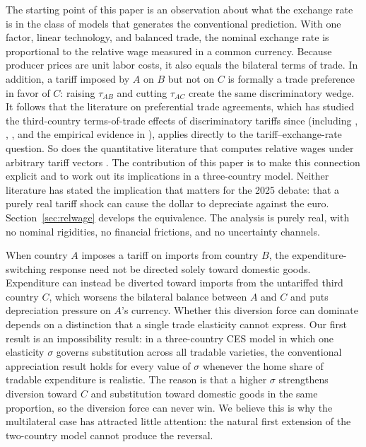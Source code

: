 \documentclass[11pt]{article}
\theoremstyle{plain}
\theoremstyle{remark}
\numberwithin{lemma}{section}
\numberwithin{proposition}{section}
\numberwithin{corollary}{section}
\newenvironment{revblock}{\par\begingroup\color{RevBlue}}{\endgroup\par}
\begin{document}
\begin{revblock}
The starting point of this paper is an observation about what the exchange rate is in the class of models that generates the conventional prediction. With one factor, linear technology, and balanced trade, the nominal exchange rate is proportional to the relative wage measured in a common currency. Because producer prices are unit labor costs, it also equals the bilateral terms of trade. In addition, a tariff imposed by $A$ on $B$ but not on $C$ is formally a trade preference in favor of $C$: raising $\tau_{AB}$ and cutting $\tau_{AC}$ create the same discriminatory wedge. It follows that the literature on preferential trade agreements, which has studied the third-country terms-of-trade effects of discriminatory tariffs since \cite{viner1950} (including \cite{mundell1964}, \cite{kempwan1976}, \cite{bagwell1999, bagwell2002}, and the empirical evidence in \cite{changwinters2002}), applies directly to the tariff--exchange-rate question. So does the quantitative literature that computes relative wages under arbitrary tariff vectors \citep{caliendo2015, ossa2014, costinot2014}. The contribution of this paper is to make this connection explicit and to work out its implications in a three-country model. Neither literature has stated the implication that matters for the 2025 debate: that a purely real tariff shock can cause the dollar to depreciate against the euro. Section~\ref{sec:relwage} develops the equivalence. The analysis is purely real, with no nominal rigidities, no financial frictions, and no uncertainty channels.

When country $A$ imposes a tariff on imports from country $B$, the expenditure-switching response need not be directed solely toward domestic goods. Expenditure can instead be diverted toward imports from the untariffed third country $C$, which worsens the bilateral balance between $A$ and $C$ and puts depreciation pressure on $A$'s currency. Whether this diversion force can dominate depends on a distinction that a single trade elasticity cannot express. Our first result is an impossibility result: in a three-country CES model in which one elasticity $\sigma$ governs substitution across all tradable varieties, the conventional appreciation result holds for every value of $\sigma$ whenever the home share of tradable expenditure is realistic. The reason is that a higher $\sigma$ strengthens diversion toward $C$ and substitution toward domestic goods in the same proportion, so the diversion force can never win. We believe this is why the multilateral case has attracted little attention: the natural first extension of the two-country model cannot produce the reversal.


\end{revblock}
\end{document}
